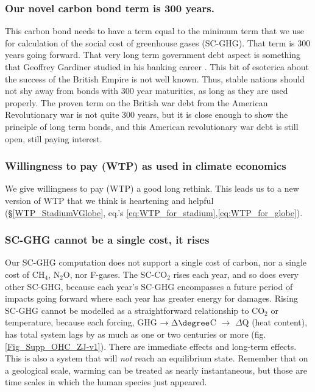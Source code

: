 \documentclass{article}
\begin{document}
\subsubsection{Our novel carbon bond term is 300 years.} This carbon bond needs to have a term equal to the minimum term that we use for calculation of the social cost of greenhouse gases (SC-GHG). That term is 300 years going forward. That very long term government debt aspect is something that Geoffrey Gardiner studied in his banking career \cite[p. 18]{Gardiner2006EvoCreidtaryControls}. This bit of esoterica about the success of the British Empire is not well known. Thus, stable nations should not shy away from bonds with 300 year maturities, as long as they are used properly. The proven term on the British war debt from the American Revolutionary war is not quite 300 years, but it is close enough to show the principle of long term bonds, and this American revolutionary war debt is still open, still paying interest. 

\subsubsection{Willingness to pay (WTP) as used in climate economics} We give willingness to pay (WTP) a good long rethink. This leads us to a new version of WTP that we think is heartening and helpful (\S\ref{WTP_StadiumVGlobe}, eq.'s \ref{eq:WTP_for_stadium},\ref{eq:WTP_for_globe}).  

\subsubsection{SC-GHG cannot be a single cost, it rises} Our SC-GHG computation does not support a single cost of carbon, nor a single cost of CH$_4$, N$_2$O, nor F-gases. The SC-CO$_2$ rises each year, and so does every other SC-GHG, because each year's SC-GHG encompasses a future period of impacts going forward where each year has greater energy for damages. Rising SC-GHG cannot be modelled as a straightforward relationship to CO$_2$ or temperature, because each forcing, GHG $\rightarrow \Delta\degree$C $\rightarrow$ $\Delta$Q (heat content), has total system lags by as much as one or two centuries or more (fig. \ref{Fig_Supp_OHC_ZJ-v1}). There are immediate effects and long-term effects.  This is also a system that will \emph{not} reach an equilibrium state.  Remember that on a geological scale, warming can be treated as nearly instantaneous, but those are time scales in which the human species just appeared.
\end{document}
